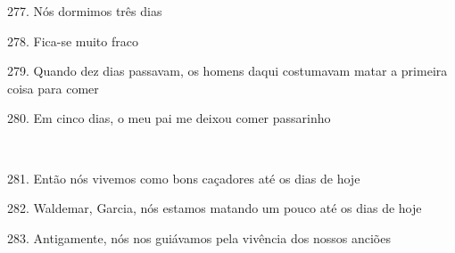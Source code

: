 277. Nós dormimos três dias

278. Fica-se muito fraco

279. Quando dez dias passavam, os homens daqui costumavam matar a
primeira coisa para comer

280. Em cinco dias, o meu pai me deixou comer passarinho

~

281. Então nós vivemos como bons caçadores até os dias de hoje

282. Waldemar, Garcia, nós estamos matando um pouco até os dias de hoje

283. Antigamente, nós nos guiávamos pela vivência dos nossos anciões



